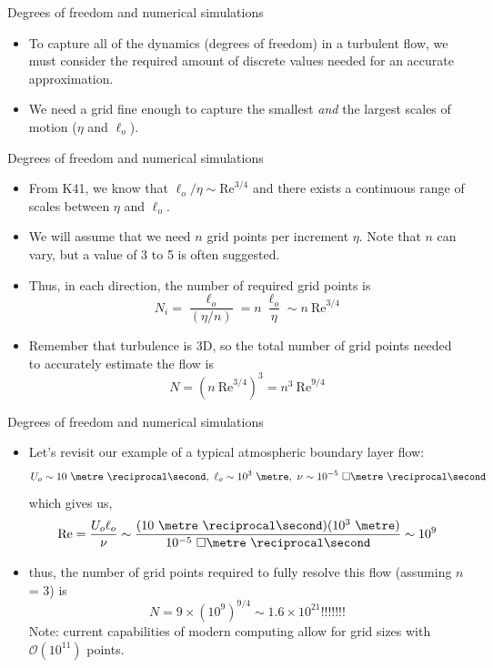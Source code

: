 
\begin{frame}{Degrees of freedom and numerical simulations}

\begin{itemize}
	\item To capture all of the dynamics (degrees of freedom) in a turbulent flow, we must consider the required amount of discrete values needed for an accurate approximation.
	\item We need a grid fine enough to capture the smallest \textit{and} the largest scales of motion ($\eta$ and $\ell_o$).
\end{itemize}
\end{frame}


\begin{frame}{Degrees of freedom and numerical simulations}

\begin{itemize}
	\item From K41, we know that $\ell_o/\eta\sim \text{Re}^{3/4}$ and there exists a continuous range of scales between $\eta$ and $\ell_o$.
	\item We will assume that we need $n$ grid points per increment $\eta$. Note that $n$ can vary, but a value of 3 to 5 is often suggested.
	\item Thus, in each direction, the number of required grid points is
	$$N_i = \frac{\ell_o}{(\eta/n)} = n\ \frac{\ell_o}{\eta} \sim n\ \text{Re}^{3/4}$$
	\item Remember that turbulence is 3D, so the total number of grid points needed to accurately estimate the flow is
	$$N = \left(n\ \text{Re}^{3/4} \right)^3 = \boxed{n^3\ \text{Re}^{9/4}}$$
\end{itemize}
\end{frame}



\begin{frame}{Degrees of freedom and numerical simulations}

\begin{itemize}
	\item Let's revisit our example of a typical atmospheric boundary layer flow:$$U_o\sim10\ \metre\ \reciprocal\second,\ \ell_o\sim10^3\ \metre,\ \nu \sim 10^{-5}\ \square\metre\ \reciprocal\second$$
	which gives us, $$\text{Re} = \frac{U_o \ell_o}{\nu} \sim \frac{(10\ \metre\ \reciprocal\second)(10^3\ \metre)}{10^{-5}\ \square\metre\ \reciprocal\second} \sim 10^9$$
	\item thus, the number of grid points required to fully resolve this flow (assuming $n$ = 3) is
	$$N = 9 \times (10^9)^{9/4}\sim 1.6\times 10^{21} \text{!!!!!!!}$$
	Note: current capabilities of modern computing allow for grid sizes with $\mathcal{O}(10^{11})$ points.
\end{itemize}
\end{frame}

